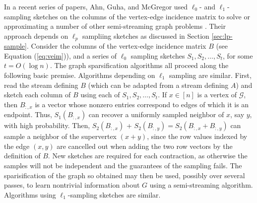 \documentclass{report}
\begin{document}
In a recent series of papers, Ahn, Guha, and McGregor used $\ell_0$- and $\ell_1$-sampling sketches on the columns of the vertex-edge incidence matrix to solve or approximating a number of other semi-streaming graph problems \cite{ahn2012analyzing,ahn2012graph}. 
Their approach depends on $\ell_p$ sampliing sketches as discussed in Section \ref{sec:lp-sample}.
Consider the columns of the vertex-edge incidence matrix $B$ (see Equation (\ref{eq:veim})), and a series of $\ell_0$ sampling sketches $S_1, S_2, \dots, S_t$, for some $t = O(\log n)$.
The graph sparsification algorithms all proceed along the following basic premise. 
Algorithms depending on $\ell_1$ sampling are similar. 
First, read the stream defining $B$ (which can be adapted from a stream defining $A$) and sketch each column of $B$ using each of $S_1, S_2, \dots, S_t$.
If $x \in [n]$ is a vertex of $\mathcal{G}$, then $B_{:,x}$ is a vector whose nonzero entries correspond to edges of which it is an endpoint. 
Thus, $S_1(B_{:,x})$ can recover a uniformly sampled neighbor of $x$, say $y$, with high probability. 
Then, $S_2(B_{:,x})$ + $S_2(B_{:,y}) = S_2(B_{:,x} + B_{:,y})$ can sample a neighbor of the supervertex $(x+y)$, since the row values indexed by the edge $(x,y)$ are cancelled out when adding the two row vectors by the definition of $B$. 
New sketches are required for each contraction, as otherwise the samples will not be independent and the guarantees of the sampling fails. 
The sparisification of the graph so obtained may then be used, possibly over several passes, to learn nontrivial information about $G$ using a semi-streaming algorithm. 
Algorithms using $\ell_1$-sampling sketches are similar. 
\end{document}
